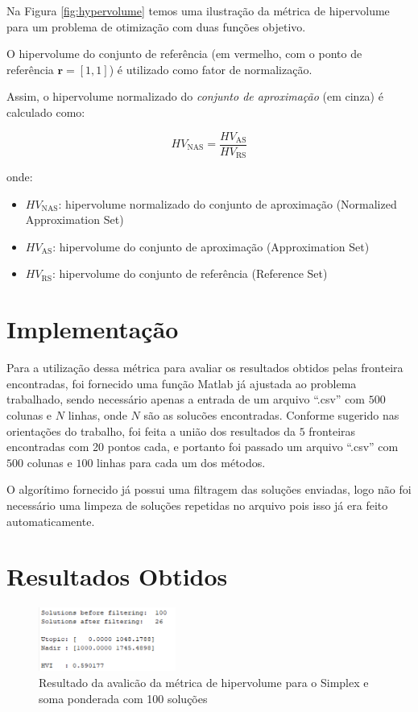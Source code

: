\documentclass[
	12pt,				%
	oneside,			%
	a4paper,			%
	chapter=TITLE,
	sumario=tradicional,
	english,			%
	brazil				%
]{abntex2}
\begin{document}
Na Figura \ref{fig:hypervolume} temos uma ilustração da métrica de hipervolume para um problema de otimização com duas funções objetivo.

O hipervolume do conjunto de referência (em vermelho, com o ponto de referência \( \mathbf{r} = [1, 1] \)) é utilizado como fator de normalização.

Assim, o hipervolume normalizado do \textit{conjunto de aproximação} (em cinza) é calculado como:

\[
HV_{\text{NAS}} = \frac{HV_{\text{AS}}}{HV_{\text{RS}}}
\]

onde:
\begin{itemize}
    \item \( HV_{\text{NAS}} \): hipervolume normalizado do conjunto de aproximação (Normalized Approximation Set)
    \item \( HV_{\text{AS}} \): hipervolume do conjunto de aproximação (Approximation Set)
    \item \( HV_{\text{RS}} \): hipervolume do conjunto de referência (Reference Set)
\end{itemize}

\section{Implementação}

Para a utilização dessa métrica para avaliar os resultados obtidos pelas fronteira encontradas, foi fornecido uma função Matlab já ajustada ao problema trabalhado,
sendo necessário apenas a entrada de um arquivo ``.csv'' com $500$ colunas e $N$ linhas, onde $N$ são as solucões encontradas. Conforme sugerido nas orientações do trabalho,
foi feita a união dos resultados da $5$ fronteiras encontradas com 20 pontos cada, e portanto foi passado um arquivo ``.csv'' com $500$ colunas e $100$ linhas para cada um dos
métodos.

O algorítimo fornecido já possui uma filtragem das soluções enviadas, logo não foi necessário uma limpeza de soluções repetidas no arquivo pois isso já era feito automaticamente.



\section{Resultados Obtidos}

\begin{figure}[h!]
	\caption{\label{fig:simplexHVI}Resultado da avalicão da métrica de hipervolume para o Simplex e soma ponderada com 100 soluções}
	\begin{center}
    \includegraphics[width=0.4\textwidth,trim=1 1 1 1,clip]{simplexHVI.png}
	\end{center}
\end{figure}
\end{document}
